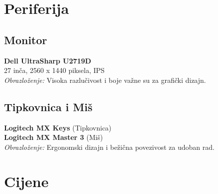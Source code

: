 \documentclass{article}
\begin{document}
\section*{Periferija}

\subsection*{Monitor}
\textbf{Dell UltraSharp U2719D} \\
27 inča, 2560 x 1440 piksela, IPS \\
\textit{Obrazloženje:} Visoka razlučivost i boje važne su za grafički dizajn.

\subsection*{Tipkovnica i Miš}
\textbf{Logitech MX Keys} (Tipkovnica) \\
\textbf{Logitech MX Master 3} (Miš) \\
\textit{Obrazloženje:} Ergonomski dizajn i bežična povezivost za udoban rad.

\section*{Cijene}
\end{document}
